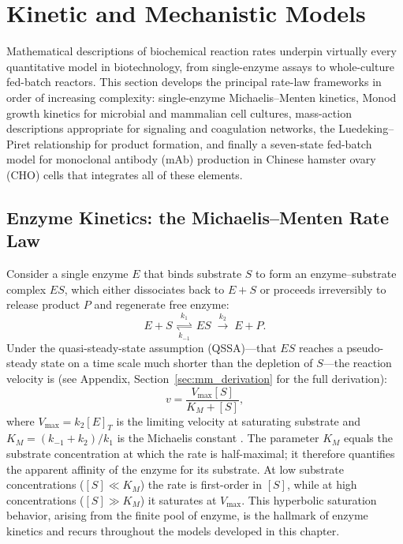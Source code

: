 \section{Kinetic and Mechanistic Models}\label{sec:kinetics}

Mathematical descriptions of biochemical reaction rates underpin virtually every
quantitative model in biotechnology, from single-enzyme assays to whole-culture
fed-batch reactors.  This section develops the principal rate-law frameworks in
order of increasing complexity: single-enzyme Michaelis--Menten kinetics, Monod
growth kinetics for microbial and mammalian cell cultures, mass-action
descriptions appropriate for signaling and coagulation networks, the
Luedeking--Piret relationship for product formation, and finally a seven-state
fed-batch model for monoclonal antibody (mAb) production in Chinese hamster ovary
(CHO) cells that integrates all of these elements.

\subsection{Enzyme Kinetics: the Michaelis--Menten Rate Law}

Consider a single enzyme $E$ that binds substrate $S$ to form an
enzyme--substrate complex $ES$, which either dissociates back to $E + S$ or
proceeds irreversibly to release product $P$ and regenerate free enzyme:
\begin{equation}\label{eq:mm_mechanism}
  E + S \;\underset{k_{-1}}{\overset{k_1}{\rightleftharpoons}}\; ES
  \;\overset{k_2}{\longrightarrow}\; E + P.
\end{equation}
Under the quasi-steady-state assumption (QSSA)---that $ES$ reaches a
pseudo-steady state on a time scale much shorter than the depletion of
$S$---the reaction velocity is (see Appendix, Section~\ref{sec:mm_derivation}
for the full derivation):
\begin{equation}\label{eq:michaelis_menten}
  v = \frac{V_{\max}[S]}{K_M + [S]},
\end{equation}
where $V_{\max} = k_2 [E]_T$ is the limiting velocity at saturating substrate
and $K_M = (k_{-1} + k_2)/k_1$ is the Michaelis constant
\cite{MichaelisMenten1913}.  The parameter $K_M$ equals the substrate
concentration at which the rate is half-maximal; it therefore quantifies the
apparent affinity of the enzyme for its substrate.  At low substrate
concentrations ($[S] \ll K_M$) the rate is first-order in $[S]$, while at high
concentrations ($[S] \gg K_M$) it saturates at $V_{\max}$.  This
hyperbolic saturation behavior, arising from the finite pool of enzyme, is the
hallmark of enzyme kinetics and recurs throughout the models developed in this
chapter.

